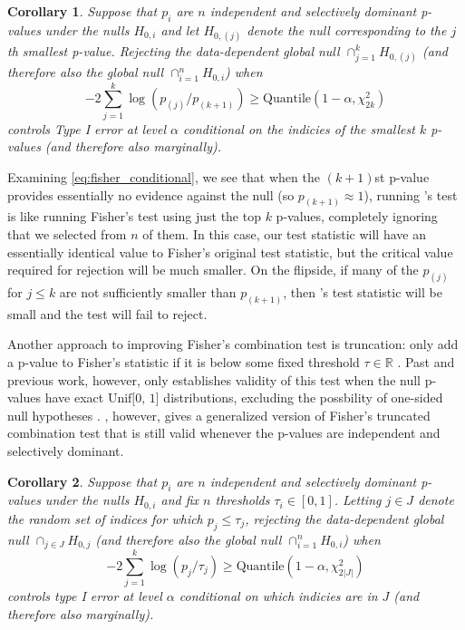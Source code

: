 \documentclass{article}
\newtheorem{corollary}{Corollary}
\newcommand{\R}{\mathbb{R}}
\begin{document}
\begin{corollary}
    \label{cor:cfisher}
    Suppose that $p_i$ are $n$ independent and selectively dominant p-values under the nulls $H_{0, i}$ and let $H_{0, (j)}$ denote the null corresponding to the $j$th smallest p-value. Rejecting the data-dependent global null $\cap_{j=1}^k H_{0, (j)}$ (and therefore also the global null $\cap_{i=1}^n H_{0, i}$) when 
    \begin{equation}
        \label{eq:fisher_conditional}
        -2 \sum_{j=1}^k \log(p_{(j)}/p_{(k+1)}) \geq \text{Quantile}(1-\alpha, \chi^2_{2k})
    \end{equation}
    controls Type I error at level $\alpha$ conditional on the indicies of the smallest $k$ p-values (and therefore also marginally). 
\end{corollary}

Examining \eqref{eq:fisher_conditional}, we see that when the $(k+1)$st p-value provides essentially no evidence against the null (so $p_{(k+1)} \approx 1$), running 's test is like running Fisher's test using just the top $k$ p-values, completely ignoring that we selected from $n$ of them. In this case, our test statistic will have an essentially identical value to Fisher's original test statistic, but the critical value required for rejection will be much smaller. On the flipside, if many of the $p_{(j)}$ for $j \leq k$ are not sufficiently smaller than $p_{(k+1)}$, then 's test statistic will be small and the test will fail to reject.

Another approach to improving Fisher's combination test is truncation: only add a p-value to Fisher's statistic if it is below some fixed threshold $\tau \in \R$ \citep{Zaykin}. Past and previous work, however, only establishes validity of this test when the null p-values have exact $\text{Unif[0, 1]}$ distributions, excluding the possbility of one-sided null hypotheses \citep{Zhang}.  , however, gives a generalized version of Fisher's truncated combination test that is still valid whenever the p-values are independent and selectively dominant.

\begin{corollary}
    \label{cor:tfisher}
    Suppose that $p_i$ are $n$ independent and selectively dominant p-values under the nulls $H_{0, i}$ and fix $n$ thresholds $\tau_i \in [0, 1]$. Letting $j \in J$ denote the random set of indices for which $p_j \leq \tau_j$, rejecting the data-dependent global null $\cap_{j \in J} H_{0, j}$ (and therefore also the global null $\cap_{i=1}^n H_{0, i}$) when 
    \begin{equation*}
        -2 \sum_{j=1}^k \log(p_j/\tau_j) \geq \text{Quantile}(1-\alpha, \chi^2_{2|J|})
    \end{equation*} 
    controls type I error at level $\alpha$ conditional on which indicies are in $J$ (and therefore also marginally). 
\end{corollary}
\end{document}
